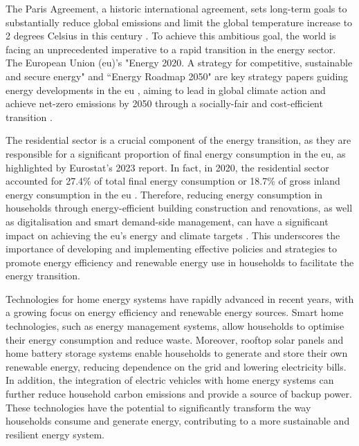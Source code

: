 
The Paris Agreement, a historic international agreement, sets long-term goals to substantially reduce global emissions and limit the global temperature increase to 2 degrees Celsius in this century \cite{paris}.
To achieve this ambitious goal, the world is facing an unprecedented imperative to a rapid transition in the energy sector. 
The European Union (\gls{eu})'s "Energy 2020. A strategy for competitive, sustainable and secure energy" and ``Energy Roadmap 2050" are key strategy papers guiding energy developments in the \gls{eu} \cite{roadmap}, aiming to lead in global climate action and achieve net-zero emissions by 2050 through a socially-fair and cost-efficient transition \cite{clean}. 



The residential sector is a crucial component of the energy transition, as they are responsible for a significant proportion of final energy consumption in the \gls{eu}, as highlighted by Eurostat's 2023 report. 
In fact, in 2020, the residential sector accounted for 27.4\% of total final energy consumption or 18.7\% of gross inland energy consumption in the \gls{eu} \cite{eurostat}. 
Therefore, reducing energy consumption in households through energy-efficient building construction and renovations, as well as digitalisation and smart demand-side management, can have a significant impact on achieving the \gls{eu}'s energy and climate targets \cite{building}. 
This underscores the importance of developing and implementing effective policies and strategies to promote energy efficiency and renewable energy use in households to facilitate the energy transition.



Technologies for home energy systems have rapidly advanced in recent years, with a growing focus on energy efficiency and renewable energy sources. 
Smart home technologies, such as energy management systems, allow households to optimise their energy consumption and reduce waste. 
Moreover, rooftop solar panels and home battery storage systems enable households to generate and store their own renewable energy, reducing dependence on the grid and lowering electricity bills. 
In addition, the integration of electric vehicles with home energy systems can further reduce household carbon emissions and provide a source of backup power. 
These technologies have the potential to significantly transform the way households consume and generate energy, contributing to a more sustainable and resilient energy system.


